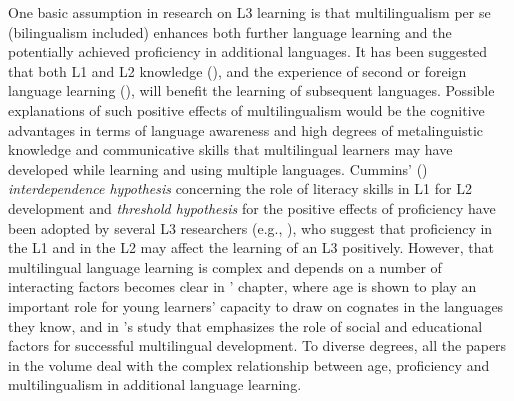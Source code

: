 \documentclass[output=paper,colorlinks,citecolor=brown,nonflat]{langsci/langscibook}
\begin{document}
One basic assumption in research on L3 learning is that multilingualism per se (bilingualism included) enhances both further language learning and the potentially achieved proficiency in additional languages. It has been suggested that both L1 and L2 knowledge (\citealt{FlynnFoleyVinnitskaya2004, BerkesFlynn2016}), and the experience of second or foreign language learning (\citealt{Hufeisen2005, Jessner2006}), will benefit the learning of subsequent languages. Possible explanations of such positive effects of multilingualism would be the cognitive advantages in terms of language awareness and high degrees of metalinguistic knowledge and communicative skills that multilingual learners may have developed while learning and using multiple languages. Cummins’ (\citeyear{Cummins1976, Cummins1991}) \textit{interdependence hypothesis} concerning the role of literacy skills in L1 for L2 development and \textit{threshold hypothesis} for the positive effects of proficiency have been adopted by several L3 researchers (e.g., \citealt{Cenoz2003}), who suggest that proficiency in the L1 and in the L2 may affect the learning of an L3 positively. However, that multilingual language learning is complex and depends on a number of interacting factors becomes clear in \citeauthor{chapters/munoz}’ chapter, where age is shown to play an important role for young learners’ capacity to draw on cognates in the languages they know, and in \citeauthor{chapters/pfenninger}’s study that emphasizes the role of social and educational factors for successful multilingual development. To diverse degrees, all the papers in the volume deal with the complex relationship between age, proficiency and multilingualism in additional language learning.
\end{document}
